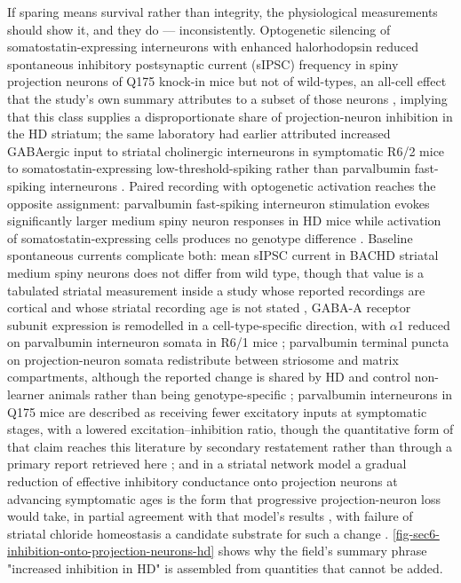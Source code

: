 \documentclass[11pt]{article}
\begin{document}
If sparing means survival rather than integrity, the physiological measurements should show it, and they do --- inconsistently. Optogenetic silencing of somatostatin-expressing interneurons with enhanced halorhodopsin reduced spontaneous inhibitory postsynaptic current (sIPSC) frequency in spiny projection neurons of Q175 knock-in mice but not of wild-types, an all-cell effect that the study's own summary attributes to a subset of those neurons \citep{Holley2019}, implying that this class supplies a disproportionate share of projection-neuron inhibition in the HD striatum; the same laboratory had earlier attributed increased GABAergic input to striatal cholinergic interneurons in symptomatic R6/2 mice to somatostatin-expressing low-threshold-spiking rather than parvalbumin fast-spiking interneurons \citep{Holley2015}. Paired recording with optogenetic activation reaches the opposite assignment: parvalbumin fast-spiking interneuron stimulation evokes significantly larger medium spiny neuron responses in HD mice while activation of somatostatin-expressing cells produces no genotype difference \citep{Cepeda2013}. Baseline spontaneous currents complicate both: mean sIPSC current in BACHD striatal medium spiny neurons does not differ from wild type, though that value is a tabulated striatal measurement inside a study whose reported recordings are cortical and whose striatal recording age is not stated \citep{Spampanato2008}, GABA-A receptor subunit expression is remodelled in a cell-type-specific direction, with $\alpha$1 reduced on parvalbumin interneuron somata in R6/1 mice \citep{Du2017}; parvalbumin terminal puncta on projection-neuron somata redistribute between striosome and matrix compartments, although the reported change is shared by HD and control non-learner animals rather than being genotype-specific \citep{Friedman2020}; parvalbumin interneurons in Q175 mice are described as receiving fewer excitatory inputs at symptomatic stages, with a lowered excitation--inhibition ratio, though the quantitative form of that claim reaches this literature by secondary restatement rather than through a primary report retrieved here \citep{Thabault2026}; and in a striatal network model a gradual reduction of effective inhibitory conductance onto projection neurons at advancing symptomatic ages is the form that progressive projection-neuron loss would take, in partial agreement with that model's results \citep{Ponzi2020}, with failure of striatal chloride homeostasis a candidate substrate for such a change \citep{Serranilla2022}. \ref{fig-sec6-inhibition-onto-projection-neurons-hd} shows why the field's summary phrase "increased inhibition in HD" is assembled from quantities that cannot be added.
\end{document}
